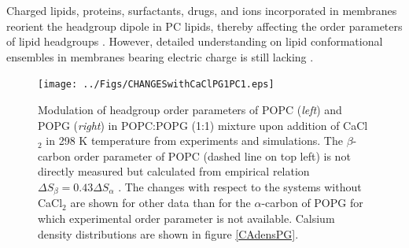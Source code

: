 \documentclass[aps,prl,superscriptaddress,twocolumn]{revtex4}
\begin{document}
Charged lipids, proteins, surfactants, drugs, and ions incorporated in membranes
reorient the headgroup dipole in PC lipids, thereby affecting the order parameters of
lipid headgroups \cite{seelig87}. However, detailed understanding on
lipid conformational ensembles in membranes bearing electric charge is still lacking \cite{Semchyschyn04}.

\begin{figure}[]
  \centering
  \texttt{[image: ../Figs/CHANGESwithCaClPG1PC1.eps]}
  \caption{\label{changesWITHCaClPG}
    Modulation of headgroup order parameters of POPC ({\it left}) and POPG ({\it right}) in POPC:POPG (1:1)
    mixture upon addition of CaCl$_2$ in 298 K temperature from experiments \cite{borle85,macdonald87} and simulations.
    The $\beta$-carbon order parameter of POPC (dashed line on top left) is not directly measured but
    calculated from empirical relation $\Delta S_{\beta}=0.43\Delta S_{\alpha}$ \cite{akutsu81}.
    The changes with respect to the systems without CaCl$_2$ are shown for other data than
    for the $\alpha$-carbon of POPG for which experimental order parameter is not available.
    Calsium density distributions are shown in figure \ref{CAdensPG}.
  }
\end{figure}
\end{document}
